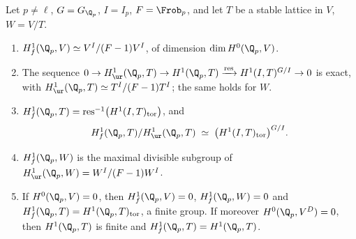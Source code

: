 \begin{proposition}\label{prop:blochkato:local-unramified}
Let $p\ne\ell$, $G=G_{\Q_p}$, $I=I_p$, $F=\Frob_p$, and let $T$ be a stable lattice in $V$, $W=V/T$.
\begin{enumerate}[label=(\roman*)]
\item $H^1_f(\Q_p,V)\simeq V^I/(F-1)V^I$, of dimension $\dim H^0(\Q_p,V)$.
\item \sloppy The sequence $0\to H^1_{\ur}(\Q_p,T)\to H^1(\Q_p,T)\xrightarrow{\operatorname{res}}H^1(I,T)^{G/I}\to0$ is exact, with $H^1_{\ur}(\Q_p,T)\simeq T^I/(F-1)T^I$; the same holds
for $W$.
\item $H^1_f(\Q_p,T)=\operatorname{res}^{-1}\bigl(H^1(I,T)_{\mathrm{tor}}\bigr)$, and
\[
H^1_f(\Q_p,T)/H^1_{\ur}(\Q_p,T)\;\simeq\;\bigl(H^1(I,T)_{\mathrm{tor}}\bigr)^{G/I}.
\]
\item $H^1_f(\Q_p,W)$ is the maximal divisible subgroup of $H^1_{\ur}(\Q_p,W)=W^I/(F-1)W^I$.
\item If $H^0(\Q_p,V)=0$, then $H^1_f(\Q_p,V)=0$, $H^1_f(\Q_p,W)=0$ and $H^1_f(\Q_p,T)=H^1(\Q_p,T)_{\mathrm{tor}}$, a finite group. If moreover $H^0(\Q_p,V^D)=0$, then
$H^1(\Q_p,T)$ is finite and $H^1_f(\Q_p,T)=H^1(\Q_p,T)$.
\end{enumerate}
\end{proposition}

